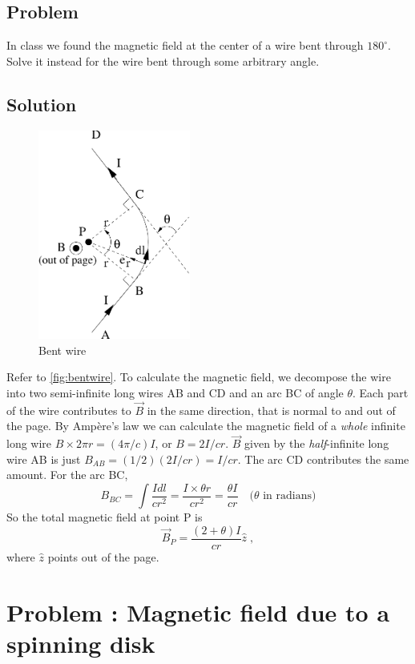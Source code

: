 \documentclass[solutions]{esg8022pset}
\begin{document}
\subsection{Problem}
  In class we found the magnetic field at the center of a wire bent through
  $180^\circ$.  Solve it instead for the wire bent through some arbitrary
  angle.
\subsection{Solution}
  \begin{figure}[H]
    \centering
    \includegraphics[width = 5cm]{BS1v05}
    \caption{Bent wire}
    \label{fig:bentwire}
  \end{figure}

  Refer to \autoref{fig:bentwire}.  To calculate the magnetic field, we
  decompose the wire into two semi-infinite long wires AB and CD and an arc BC
  of angle $\theta$.  Each part of the wire contributes to $\vec{B}$ in the same
  direction, that is normal to and out of the page.  By Amp\`{e}re's law we can
  calculate the magnetic field of a \emph{whole} infinite long wire $B\times 2\pi
  r=(4\pi/c)I$, or $B=2I/cr$.   $\vec{B}$ given by the \emph{half}-infinite
  long wire AB is just $B_{AB}=(1/2) (2I/cr)=I/cr$.  The arc CD contributes the same amount.
    For the arc BC,
  \begin{equation}
    B_{BC}=\int\frac{Idl}{cr^2}=\frac{I\times \theta r}{cr^2}=\frac{\theta I}{cr}\quad\text{($\theta$ in radians)}
  \end{equation}
  So the total magnetic field at point P is
  \begin{equation}
    \vec B_P=\frac{(2+\theta)I}{cr}\hat z\;,
  \end{equation}
  where $\hat z$ points out of the page.
\section{Problem \thesection: Magnetic field due to a spinning disk}
\end{document}
